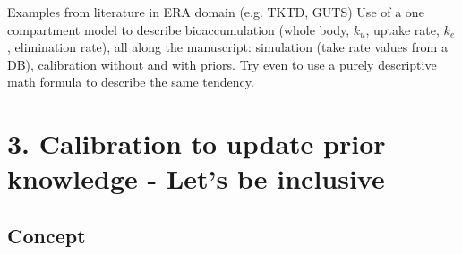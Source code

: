\documentclass [english,11pt]{article} %
\begin{document}
\noindent
Examples from literature in ERA domain
(e.g. TKTD, GUTS)
Use of a one compartment model to describe bioaccumulation (whole body, $k_u$, uptake rate, $k_e$, elimination rate), all along the manuscript: simulation (take rate values from a DB), calibration without and with priors. Try even to use a purely descriptive math formula to describe the same tendency.
\cite{Ratier2021}
\cite{rbioacc2021}




\newpage 

\section*{3. Calibration to update prior knowledge  - Let’s be inclusive} 
\label{sec:3}



\subsection*{Concept}

\noindent
\end{document}
